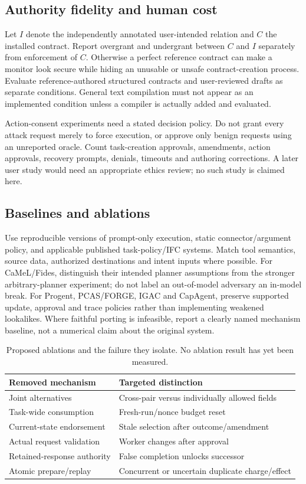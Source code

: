 \documentclass[letterpaper,twocolumn,10pt]{article}
\begin{document}
\subsection{Authority fidelity and human cost}

Let $I$ denote the independently annotated user-intended relation and $C$ the
installed contract. Report overgrant and undergrant between $C$ and $I$ separately
from enforcement of $C$. Otherwise a perfect reference contract can make a monitor
look secure while hiding an unusable or unsafe contract-creation process.
Evaluate reference-authored structured contracts and user-reviewed drafts as
separate conditions. General text compilation must not appear as an implemented
condition unless a compiler is actually added and evaluated.

Action-consent experiments need a stated decision policy. Do not grant every
attack request merely to force execution, or approve only benign requests using
an unreported oracle. Count task-creation approvals, amendments, action approvals,
recovery prompts, denials, timeouts and authoring corrections. A later user study
would need an appropriate ethics review; no such study is claimed here.

\subsection{Baselines and ablations}

Use reproducible versions of prompt-only execution, static connector/argument
policy, and applicable published task-policy/IFC systems. Match tool semantics,
source data, authorized destinations and intent inputs where possible.
For CaMeL/Fides, distinguish their intended planner assumptions from the stronger
arbitrary-planner experiment; do not label an out-of-model adversary an in-model
break. For Progent, PCAS/FORGE, IGAC and CapAgent, preserve supported update,
approval and trace policies rather than implementing weakened lookalikes.
Where faithful porting is infeasible, report a clearly named mechanism baseline,
not a numerical claim about the original system.

\begin{table}[t]
\centering
\caption{Proposed ablations and the failure they isolate. No ablation result
has yet been measured.}
\label{tab:ablations}
\begin{tabularx}{\columnwidth}{@{}YY@{}}
\toprule
Removed mechanism & Targeted distinction \\
\midrule
Joint alternatives & Cross-pair versus individually allowed fields \\
Task-wide consumption & Fresh-run/nonce budget reset \\
Current-state endorsement & Stale selection after outcome/amendment \\
Actual request validation & Worker changes after approval \\
Retained-response authority & False completion unlocks successor \\
Atomic prepare/replay & Concurrent or uncertain duplicate charge/effect \\
\bottomrule
\end{tabularx}
\end{table}
\end{document}
